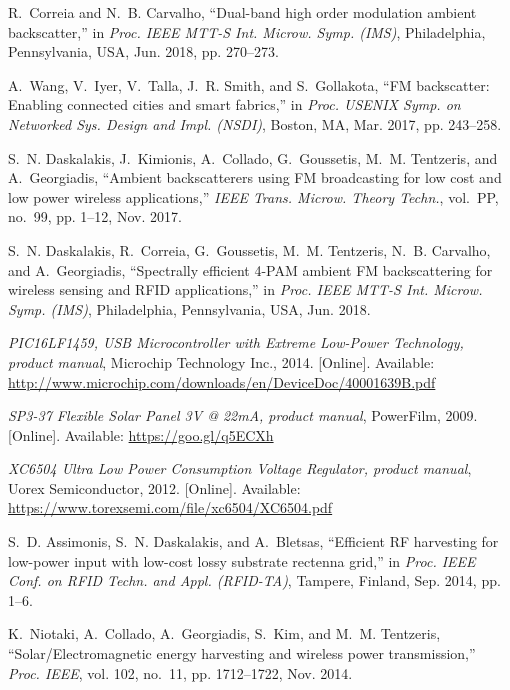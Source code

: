 \documentclass[journal]{IEEEtran}
\begin{document}
\begin{thebibliography}{10}
R.~Correia and N.~B. Carvalho, ``Dual-band high order modulation ambient
  backscatter,'' in \emph{Proc. {IEEE} MTT-S Int. Microw. Symp. (IMS)},
  Philadelphia, Pennsylvania, USA, Jun. 2018, pp. 270--273.

A.~Wang, V.~Iyer, V.~Talla, J.~R. Smith, and S.~Gollakota, ``{FM} backscatter:
  Enabling connected cities and smart fabrics,'' in \emph{Proc. USENIX Symp. on
  Networked Sys. Design and Impl. (NSDI)}, Boston, MA, Mar. 2017, pp. 243--258.

S.~N. Daskalakis, J.~Kimionis, A.~Collado, G.~Goussetis, M.~M. Tentzeris, and
  A.~Georgiadis, ``Ambient backscatterers using {FM} broadcasting for low cost
  and low power wireless applications,'' \emph{{IEEE} Trans. Microw. Theory
  Techn.}, vol.~PP, no.~99, pp. 1--12, Nov. 2017.

S.~N. Daskalakis, R.~Correia, G.~Goussetis, M.~M. Tentzeris, N.~B. Carvalho,
  and A.~Georgiadis, ``Spectrally efficient 4-{PAM} ambient {FM} backscattering
  for wireless sensing and {RFID} applications,'' in \emph{Proc. {IEEE} MTT-S
  Int. Microw. Symp. (IMS)}, Philadelphia, Pennsylvania, USA, Jun. 2018.

\BIBentryALTinterwordspacing
\emph{{PIC16LF1459}, {USB} Microcontroller with Extreme Low-Power Technology,
  product manual}, {M}icrochip {T}echnology {I}nc., 2014. [Online]. Available:
  \url{http://www.microchip.com/downloads/en/DeviceDoc/40001639B.pdf}
\BIBentrySTDinterwordspacing

\BIBentryALTinterwordspacing
\emph{{SP3-37} {F}lexible {S}olar {P}anel 3{V} @ 22mA, product manual},
  {P}owerFilm, 2009. [Online]. Available: \url{https://goo.gl/q5ECXh}
\BIBentrySTDinterwordspacing

\BIBentryALTinterwordspacing
\emph{{XC6504} Ultra Low Power Consumption Voltage Regulator, product manual},
  {U}orex {S}emiconductor, 2012. [Online]. Available:
  \url{https://www.torexsemi.com/file/xc6504/XC6504.pdf}
\BIBentrySTDinterwordspacing

S.~D. Assimonis, S.~N. Daskalakis, and A.~Bletsas, ``Efficient {RF} harvesting
  for low-power input with low-cost lossy substrate rectenna grid,'' in
  \emph{Proc. {IEEE} Conf. on RFID Techn. and Appl. (RFID-TA)}, Tampere,
  {F}inland, Sep. 2014, pp. 1--6.

K.~Niotaki, A.~Collado, A.~Georgiadis, S.~Kim, and M.~M. Tentzeris,
  ``Solar/{E}lectromagnetic energy harvesting and wireless power
  transmission,'' \emph{Proc. {IEEE}}, vol. 102, no.~11, pp. 1712--1722, Nov.
  2014.


\end{thebibliography}
\end{document}
